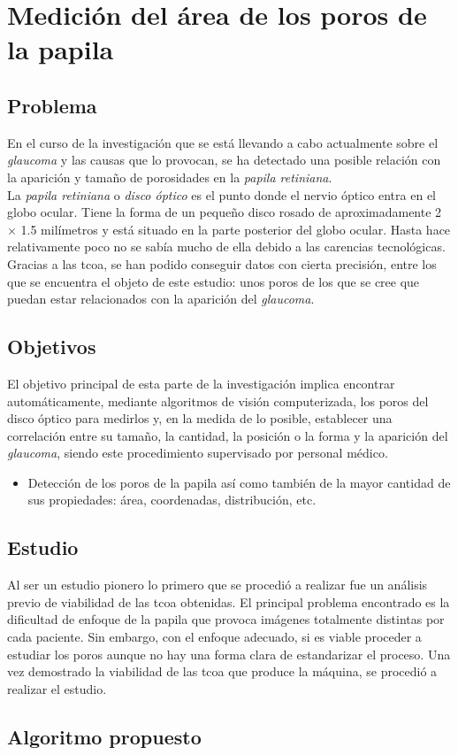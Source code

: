 \chapter{Medición del área de los poros de la papila}
\section{Problema}
En el curso de la investigación que se está llevando a cabo
actualmente sobre el \emph{glaucoma} y las causas que lo provocan, se
ha detectado una posible relación con la aparición y tamaño de
porosidades en la \emph{papila retiniana}. \\
La \emph{papila retiniana} o \emph{disco óptico} es el punto donde el
nervio óptico entra en el globo ocular. Tiene la forma de un pequeño
disco rosado de aproximadamente 2 $\times$ 1.5 milímetros y está
situado en la parte posterior del globo ocular. Hasta hace
relativamente poco no se sabía mucho de ella debido a las carencias
tecnológicas. Gracias a las \gls{tcoa}, se han podido conseguir datos
con cierta precisión, entre los que se encuentra el objeto de este
estudio: unos poros de los que se cree que puedan estar
relacionados con la aparición del \emph{glaucoma}.\\

\section{Objetivos}
El objetivo principal de esta parte de la investigación implica
encontrar automáticamente, mediante algoritmos de visión
computerizada, los poros del disco óptico para medirlos y, en la
medida de lo posible, establecer una correlación entre su tamaño, la
cantidad, la posición o la forma y la aparición del \emph{glaucoma},
siendo este procedimiento supervisado por personal médico.
\begin{itemize}
\item Detección de los poros de la papila así como también de la mayor
  cantidad de sus propiedades: área, coordenadas, distribución, etc.
\end{itemize}

\section{Estudio}
Al ser un estudio pionero lo primero que se procedió a realizar fue un
análisis previo de viabilidad de las \gls{tcoa} obtenidas. El
principal problema encontrado es la dificultad de enfoque de la papila
que provoca imágenes totalmente distintas por cada paciente. Sin
embargo, con el enfoque adecuado, si es viable proceder a estudiar los
poros aunque no hay una forma clara de estandarizar el proceso. Una
vez demostrado la viabilidad de las \gls{tcoa} que produce la máquina,
se procedió a realizar el estudio.
\section{Algoritmo propuesto}
